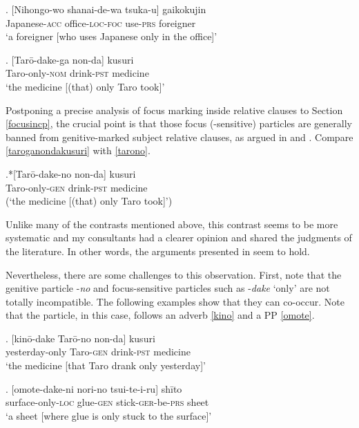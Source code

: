 \exg. [Nihongo-wo shanai-de-wa tsuka-u] gaikokujin\\
Japanese-\textsc{acc} office-\textsc{loc}-\textsc{foc} use-\textsc{prs} foreigner\\
`a foreigner [who uses Japanese only in the office]’ \label{shanai} \\ \null \hfill \citep[93]{akaso:2011:on} \label{shanai-de}

\exg. [Tarō-dake-ga non-da] kusuri\\
Taro-only-\textsc{nom} drink-\textsc{pst} medicine\\
`the medicine [(that) only Taro took]’ \null \hfill \citep[96]{akaso:2011:on} \label{taroganondakusuri}

Postponing a precise analysis of focus marking inside relative clauses to Section \ref{focusincp}, the crucial point is that those focus (-sensitive) particles are generally banned from genitive-marked subject relative clauses, as argued in \citet{akaso:2011:on} and \citet{miyagawa:2017:agreement}. Compare \ref{taroganondakusuri} with \ref{tarono}.

\exg.*[Tarō-dake-no non-da] kusuri \label{kusuri} \\
Taro-only-\textsc{gen} drink-\textsc{pst} medicine\\
(`the medicine [(that) only Taro took]’) \null \hfill \citep[96]{akaso:2011:on} \label{tarono}

Unlike many of the contrasts mentioned above, this contrast seems to be more systematic and my consultants had a clearer opinion and shared the judgments of the literature. In other words, the arguments presented in \citet{miyagawa:2017:agreement} seem to hold.

Nevertheless, there are some challenges to this observation. First, note that the genitive particle -\textit{no} and focus-sensitive particles such as -\textit{dake} `only' are not totally incompatible. The following examples show that they can co-occur. Note that the particle, in this case, follows an adverb \ref{kino} and a PP \ref{omote}.

\exg. [kinō-dake Tarō-no non-da] kusuri\\
yesterday-only Taro-\textsc{gen} drink-\textsc{pst} medicine\\
`the medicine [that Taro drank only yesterday]’ \null \hfill \citep[692]{ochi:2017:ga} \label{kino}

\exg. [omote-dake-ni nori-no tsui-te-i-ru] shīto\\
surface-only-\textsc{loc} glue-\textsc{gen} stick-\textsc{ger}-be-\textsc{prs} sheet\\
`a sheet [where glue is only stuck to the surface]’ \label{omote}

